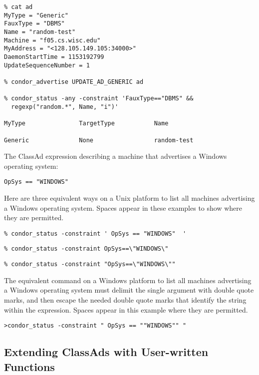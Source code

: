 \footnotesize
\begin{verbatim}
% cat ad
MyType = "Generic"
FauxType = "DBMS"
Name = "random-test"
Machine = "f05.cs.wisc.edu"
MyAddress = "<128.105.149.105:34000>"
DaemonStartTime = 1153192799
UpdateSequenceNumber = 1

% condor_advertise UPDATE_AD_GENERIC ad

% condor_status -any -constraint 'FauxType=="DBMS" && 
  regexp("random.*", Name, "i")'

MyType               TargetType           Name                          

Generic              None                 random-test                   

\end{verbatim}
\normalsize

The ClassAd expression describing a machine that
advertises a Windows operating system:
\footnotesize
\begin{verbatim}
OpSys == "WINDOWS"
\end{verbatim}
\normalsize
Here are three equivalent ways on a Unix platform to list all machines
advertising a Windows operating system.
Spaces appear in these examples to show where they are permitted.
\footnotesize
\begin{verbatim}
% condor_status -constraint ' OpSys == "WINDOWS"  '
\end{verbatim}
\normalsize
\footnotesize
\begin{verbatim}
% condor_status -constraint OpSys==\"WINDOWS\"
\end{verbatim}
\normalsize
\footnotesize
\begin{verbatim}
% condor_status -constraint "OpSys==\"WINDOWS\""
\end{verbatim}
\normalsize

The equivalent command on a Windows platform to list all machines
advertising a Windows operating system must delimit the single
argument with double quote marks, and then escape the needed
double quote marks that identify the string within the expression. 
Spaces appear in this example where they are permitted.
\footnotesize
\begin{verbatim}
>condor_status -constraint " OpSys == ""WINDOWS"" "
\end{verbatim}
\normalsize

\subsection{\label{sec:classad-userfunctions}
Extending ClassAds with User-written Functions}

